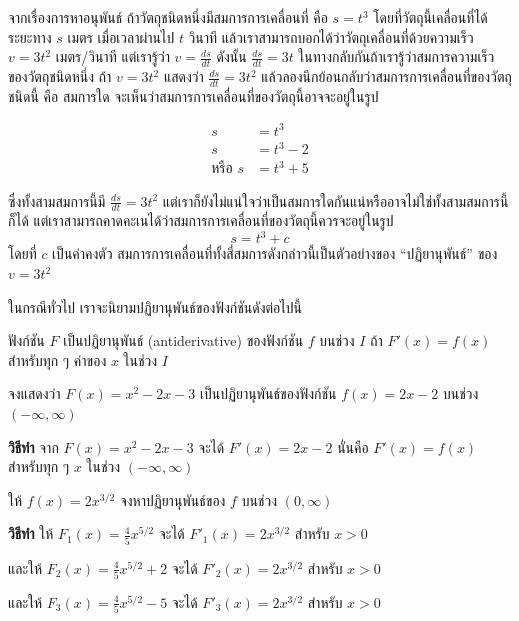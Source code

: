 \documentclass[
]{book}
\begin{document}
จากเรื่องการหาอนุพันธ์ ถ้าวัตถุชนิดหนึ่งมีสมการการเคลื่อนที่ คือ \(s = t^{3}\)
โดยที่วัตถุนี้เคลื่อนที่ได้ระยะทาง \(s\) เมตร เมื่อเวลาผ่านไป \(t\) วินาที
แล้วเราสามารถบอกได้ว่าวัตถุเคลื่อนที่ด้วยความเร็ว \(v =
3t^2\) เมตร/วินาที แต่เรารู้ว่า \(\displaystyle v = \frac{ds}{dt}\) ดังนั้น
\(\displaystyle  \frac{ds}{dt} = 3t\)
ในทางกลับกันถ้าเรารู้ว่าสมการความเร็วของวัตถุชนิดหนึ่ง ถ้า \(v = 3t^{2}\) แสดงว่า
\(\displaystyle \frac{ds}{dt} = 3t^2\)
แล้วลองนึกย้อนกลับว่าสมการการเคลื่อนที่ของวัตถุชนิดนี้ คือ สมการใด
จะเห็นว่าสมการการเคลื่อนที่ของวัตถุนี้อาจจะอยู่ในรูป

\begin{equation}
\begin{aligned}
    s &= t^3 \\ 
    s &= t^3 -2 \\
    \text{หรือ  } s &= t^3 + 5
\end{aligned}
\end{equation}

ซึ่งทั้งสามสมการนี้มี \(\displaystyle  \frac{ds}{dt}= 3t^2\)
แต่เราก็ยังไม่แน่ใจว่าเป็นสมการใดกันแน่หรืออาจไม่ใช่ทั้งสามสมการนี้ก็ได้
แต่เราสามารถคาดคะเนได้ว่าสมการการเคลื่อนที่ของวัตถุนี้ควรจะอยู่ในรูป \[s = t^{3} + c\]
โดยที่ \(c\) เป็นค่าคงตัว สมการการเคลื่อนที่ทั้งสี่สมการดังกล่าวนี้เป็นตัวอย่างของ
``ปฏิยานุพันธ์'' ของ \(v = 3t^{2}\)

ในกรณีทั่วไป เราจะนิยามปฏิยานุพันธ์ของฟังก์ชันดังต่อไปนี้

ฟังก์ชัน \(F\) เป็นปฏิยานุพันธ์ (antiderivative) ของฟังก์ชัน \(f\) บนช่วง \(I\) ถ้า
\(F'(x) = f(x)\) สำหรับทุก ๆ ค่าของ \(x\) ในช่วง \(I\)

จงแสดงว่า \(F(x) = x^{2}-2x- 3\) เป็นปฏิยานุพันธ์ของฟังก์ชัน \(f(x)=2x-2\) บนช่วง
\(\left( {-\infty ,\infty } \right)\)

\textbf{วิธีทำ} จาก \(F(x) = x^{2} - 2x - 3\) จะได้ \(F'(x)
= 2x - 2\) นั่นคือ \(F'(x) = f(x)\) สำหรับทุก ๆ \(x\) ในช่วง \(\left( {-\infty
,\infty } \right)\)

ให้ \(f(x) = 2x^{3/2}\) จงหาปฏิยานุพันธ์ของ \(f\) บนช่วง
\(\left( {0 ,\infty } \right)\)

\textbf{วิธีทำ} ให้ \(\displaystyle F_{1}(x) = \frac{4}{5} x^{5/2}\) จะได้
\(F'_1(x) = 2x^{3/2}\) สำหรับ \(x > 0\)

และให้ \(\displaystyle F_{2}(x) = \frac{4}{5} x^{5/2} + 2\) จะได้
\(F'_2(x) = 2x^{3/2}\) สำหรับ \(x > 0\)

และให้ \(\displaystyle F_{3}(x) = \frac{4}{5} x^{5/2} - 5\) จะได้
\(F'_3(x) = 2x^{3/2}\) สำหรับ \(x > 0\)
\end{document}
